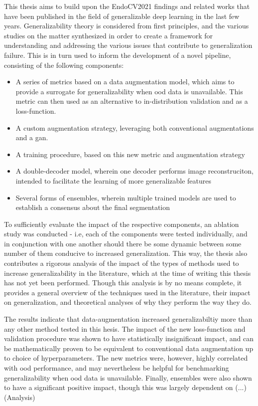     This thesis aims to build upon the EndoCV2021 findings and related works that have been published in the field of generalizable deep learning in the last few years. Generalizability theory is considered from first principles, and the various studies on the matter synthesized in order to create a framework for understanding and addressing the various issues that contribute to generalization failure. This is in turn used to inform the development of a novel pipeline, consisting of the following components:
    \begin{itemize}
        \item A series of metrics based on a data augmentation model, which aims to provide a surrogate for generalizability when \gls{ood} data is unavailable. This metric can then used as an alternative to in-distribution validation and as a loss-function. 
        \item A custom augmentation strategy, leveraging both conventional augmentations and a \gls{gan}. 
        \item A training procedure, based on this new metric and augmentation strategy
        \item A double-decoder model, wherein one decoder performs image reconstruciton, intended to facilitate the learning of more generalizable features
        \item Several forms of ensembles, wherein multiple trained models are used to establish a consensus about the final segmentation
    \end{itemize}
    

    To sufficiently evaluate the impact of the respective components, an ablation study was conducted - i.e, each of the components were tested individually, and in conjunction with one another should there be some dynamic between some number of them conducive to increased generalization. This way, the thesis also contributes a rigorous analysis of the impact of the types of methods used to increase generalizability in the literature, which at the time of writing this thesis has not yet been performed. Though this analysis is by no means complete, it provides a general overview of the techniques used in the literature, their impact on generalization, and theoretical analyses of why they perform the way they do.
    
    The results indicate that data-augmentation increased generalizabiltiy more than any other method tested in this hesis. The impact of the new loss-function and validation procedure was shown to have statistically insignificant impact, and can be mathematically proven to be equivalent to conventional data augmentation up to choice of hyperparameters. The new metrics were, however, highly correlated with \gls{ood} performance, and may nevertheless be helpful for benchmarking generalizability when \gls{ood} data is unavailable. Finally, ensembles were also shown to have a significant positive impact, though this was largely dependent on (...)  
    (Analysis)

